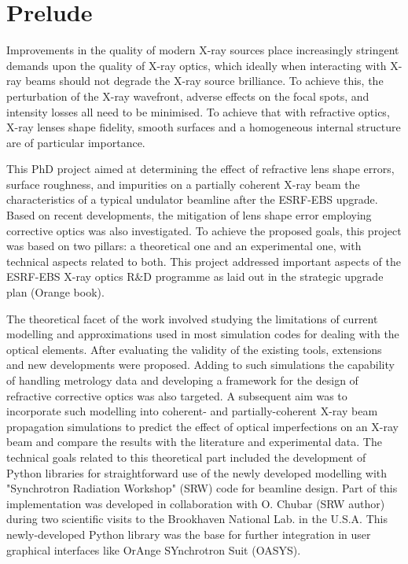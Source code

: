 \chapter*{Prelude}

Improvements in the quality of modern X-ray sources place increasingly stringent demands upon the quality of X-ray optics, which ideally when interacting with X-ray beams should not degrade the X-ray source brilliance. To achieve this, the perturbation of the X-ray wavefront, adverse effects on the focal spots, and intensity losses all need to be minimised. To achieve that with refractive optics, X-ray lenses shape fidelity, smooth surfaces and a homogeneous internal structure are of particular importance. 

This PhD project aimed at determining the effect of refractive lens shape errors, surface roughness, and impurities on a partially coherent X-ray beam the characteristics of a typical undulator beamline after the ESRF-EBS upgrade. Based on recent developments, the mitigation of lens shape error employing corrective optics was also investigated. To achieve the proposed goals, this project was based on two pillars: a theoretical one and an experimental one, with technical aspects related to both. This project addressed important aspects of the ESRF-EBS X-ray optics R$\&$D programme as laid out in the strategic upgrade plan (Orange book).

The theoretical facet of the work involved studying the limitations of current modelling and approximations used in most simulation codes for dealing with the optical elements. After evaluating the validity of the existing tools, extensions and new developments were proposed. Adding to such simulations the capability of handling metrology data and developing a framework for the design of refractive corrective optics was also targeted. A subsequent aim was to incorporate such modelling into coherent- and partially-coherent X-ray beam propagation simulations to predict the effect of optical imperfections on an X-ray beam and compare the results with the literature and experimental data. The technical goals related to this theoretical part included the development of Python libraries for straightforward use of the newly developed modelling with "Synchrotron Radiation Workshop" (SRW) code for beamline design. Part of this implementation was developed in collaboration with O. Chubar (SRW author) during two scientific visits to the Brookhaven National Lab. in the U.S.A. This newly-developed Python library was the base for further integration in user graphical interfaces like OrAnge SYnchrotron Suit (OASYS). 

